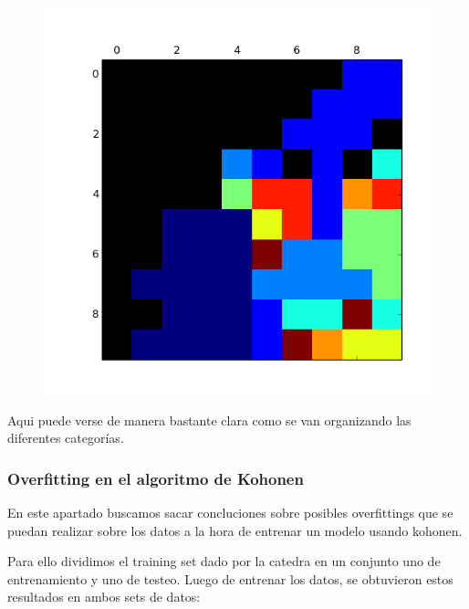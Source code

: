 \begin{figure}[h!]
\begin{minipage}{.15\textwidth}
  \label{fig:test2}
\end{minipage}
\begin{minipage}{.15\textwidth}
  \centering
  \includegraphics[width=.9\linewidth]{img/convergencia_kohonen/entrenamiento_100.png}
  \label{fig:test2}
\end{minipage}
\end{figure}

Aqui puede verse de manera bastante clara como se van organizando las diferentes categorías.

\subsubsection{Overfitting en el algoritmo de Kohonen}

En este apartado buscamos sacar concluciones sobre posibles overfittings que se puedan realizar sobre los datos a la hora de entrenar un modelo usando kohonen.

Para ello dividimos el training set dado por la catedra en un conjunto uno de entrenamiento y uno de testeo. Luego de entrenar los datos, se obtuvieron estos resultados en ambos sets de datos:

